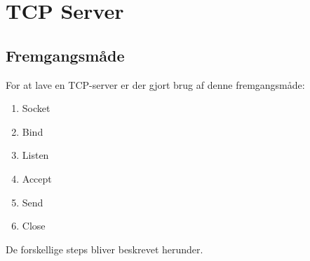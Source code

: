 \documentclass[12pt,fleqn,a4paper]{report}
\begin{document}


\newpage

\chapter{TCP Server}


\section{Fremgangsmåde}
For at lave en TCP-server er der gjort brug af denne fremgangsmåde:
\begin{enumerate}
	\item Socket
	\item Bind
	\item Listen
	\item Accept
	\item Send
	\item Close
\end{enumerate}
De forskellige steps bliver beskrevet herunder.
\end{document}
